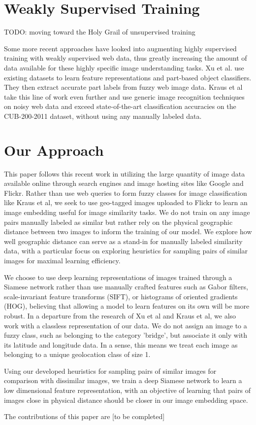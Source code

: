 \section{Weakly Supervised Training}
TODO: moving toward the Holy Grail of unsupervised training

Some more recent approaches have looked into augmenting highly supervised training with weakly supervised web data, thus greatly increasing the amount of data available for these highly specific image understanding tasks. Xu et al.\cite{xu2015augmenting} use existing datasets to learn feature representations and part-based object classifiers. They then extract accurate part labels from fuzzy web image data. Kraus et al take this line of work even further and use generic image recognition techniques on noisy web data and exceed state-of-the-art classification accuracies on the CUB-200-2011 dataset, without using any manually labeled data.\cite{krause2016unreasonable}

\section{Our Approach}
This paper follows this recent work in utilizing the large quantity of image data available online through search engines and image hosting sites like Google and Flickr. Rather than use web queries to form fuzzy classes for image classification like Kraus et al, we seek to use geo-tagged images uploaded to Flickr to learn an image embedding useful for image similarity tasks. We do not train on any image pairs manually labeled as similar but rather rely on the physical geographic distance between two images to inform the training of our model. We explore how well geographic distance can serve as a stand-in for manually labeled similarity data, with a particular focus on exploring heuristics for sampling pairs of similar images for maximal learning efficiency.

We choose to use deep learning representations of images trained through a Siamese network rather than use manually crafted features such as Gabor filters, scale-invariant feature transforms (SIFT), or histograms of oriented gradients (HOG), believing that allowing a model to learn features on its own will be more robust. In a departure from the research of Xu et al and Kraus et al, we also work with a classless representation of our data. We do not assign an image to a fuzzy class, such as belonging to the category 'bridge', but associate it only with its latitude and longitude data. In a sense, this means we treat each image as belonging to a unique geolocation class of size 1.

Using our developed heuristics for sampling pairs of similar images for comparison with dissimilar images, we train a deep Siamese network to learn a low dimensional feature representation, with an objective of learning that pairs of images close in physical distance should be closer in our image embedding space.

The contributions of this paper are [to be completed]
